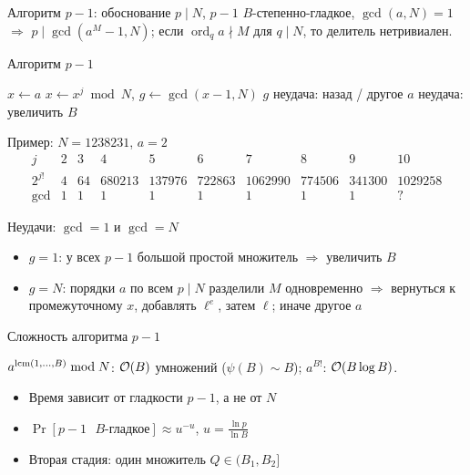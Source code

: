 \documentclass{ca-slides}
\begin{document}
\begin{theoremframe}{Алгоритм $p - 1$: обоснование}
  $p \mid N$, $p - 1$ $B$-степенно-гладкое, $\gcd(a, N) = 1$ $\Rightarrow$
  $p \mid \gcd(a^M - 1, N)$; если $\operatorname{ord}_q a \nmid M$ для $q \mid N$, то
  делитель нетривиален.
\end{theoremframe}

\begin{canvasframe}{Алгоритм $p - 1$}
  \small
  \begin{algorithmic}[1]
    \State $x \gets a$ 
      \State $x \gets x^j \bmod N$, \quad $g \gets \gcd(x - 1, N)$ 
       \Return $g$ \EndIf
       \Return неудача: назад / другое $a$ \EndIf
    \EndFor
    \State \Return неудача: увеличить $B$
  \end{algorithmic}
\end{canvasframe}

\begin{canvasframe}{Пример: $N = 1238231$, $a = 2$}
  \footnotesize
  \[
  \begin{array}{c|rrrrrrrrr}
    j & 2 & 3 & 4 & 5 & 6 & 7 & 8 & 9 & 10\\ \hline
    2^{j!} & 4 & 64 & 680213 & 137976 & 722863 & 1062990 & 774506 & 341300 & 1029258\\
    \gcd & 1 & 1 & 1 & 1 & 1 & 1 & 1 & 1 & ?
  \end{array}
  \]
  \penspace[0.45\textheight]
\end{canvasframe}

\begin{canvasframe}{Неудачи: $\gcd = 1$ и $\gcd = N$}
  \small
  \begin{itemize}
    \item $g = 1$: у всех $p - 1$ большой простой множитель $\Rightarrow$ увеличить $B$
    \item $g = N$: порядки $a$ по всем $p \mid N$ разделили $M$ одновременно
      $\Rightarrow$ вернуться к промежуточному $x$, добавлять $\ell^{e}$, затем $\ell$;
      иначе другое $a$
  \end{itemize}
  \penspace[0.2\textheight]
\end{canvasframe}

\begin{canvasframe}{Сложность алгоритма $p - 1$}
  \small
  \begin{proposition}
    $a^{\operatorname{lcm}(1, \dots, B)} \bmod N$: $\mathcal{O}(B)$ умножений ($\psi(B) \sim B$);
    $a^{B!}$: $\mathcal{O}(B \log B)$.
  \end{proposition}
  \begin{itemize}
    \item Время зависит от гладкости $p - 1$, а не от $N$
    \item $\Pr[p - 1 \text{ $B$-гладкое}] \approx u^{-u}$, $u = \frac{\ln p}{\ln B}$
    \item Вторая стадия: один множитель $Q \in (B_1, B_2]$
  \end{itemize}
\end{canvasframe}
\end{document}
